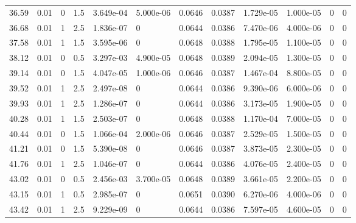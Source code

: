 \documentclass[preview]{standalone}
\begin{document}
{{{\begin{tabular}{L{1.2cm}C{1.2cm} C{0.3cm}C{0.5cm} C{1.4cm}C{1.4cm} C{1.4cm}C{1.4cm} C{1.6cm}C{1.6cm} C{1.6cm}C{1.6cm}}
  36.59  &  0.01  & 0     & 1.5 &  3.649e-04  & 5.000e-06  &  0.0646&   0.0387& 1.729e-05 & 1.000e-05   &  0 & 0  \\ 
  36.68  &  0.01  & 1     & 2.5 &  1.836e-07  & 0  &  0.0644&   0.0386& 7.470e-06 & 4.000e-06   &  0 & 0  \\ 
  37.58  &  0.01  & 1     & 1.5 &  3.595e-06  & 0  &  0.0648&   0.0388& 1.795e-05 & 1.100e-05   &  0 & 0  \\ 
  38.12  &  0.01  & 0     & 0.5 &  3.297e-03  & 4.900e-05  &  0.0648&   0.0389& 2.094e-05 & 1.300e-05   &  0 & 0  \\ 
  39.14  &  0.01  & 0     & 1.5 &  4.047e-05  & 1.000e-06  &  0.0646&   0.0387& 1.467e-04 & 8.800e-05   &  0 & 0  \\ 
  39.52  &  0.01  & 1     & 2.5 &  2.497e-08  & 0  &  0.0644&   0.0386& 9.390e-06 & 6.000e-06   &  0 & 0  \\ 
  39.93  &  0.01  & 1     & 2.5 &  1.286e-07  & 0  &  0.0644&   0.0386& 3.173e-05 & 1.900e-05   &  0 & 0  \\ 
  40.28  &  0.01  & 1     & 1.5 &  2.503e-07  & 0  &  0.0648&   0.0388& 1.170e-04 & 7.000e-05   &  0 & 0  \\ 
  40.44  &  0.01  & 0     & 1.5 &  1.066e-04  & 2.000e-06  &  0.0646&   0.0387& 2.529e-05 & 1.500e-05   &  0 & 0  \\ 
  41.21  &  0.01  & 0     & 1.5 &  5.390e-08  & 0  &  0.0646&   0.0387& 3.873e-05 & 2.300e-05   &  0 & 0  \\ 
  41.76  &  0.01  & 1     & 2.5 &  1.046e-07  & 0  &  0.0644&   0.0386& 4.076e-05 & 2.400e-05   &  0 & 0  \\ 
  43.02  &  0.01  & 0     & 0.5 &  2.456e-03  & 3.700e-05  &  0.0648&   0.0389& 3.661e-05 & 2.200e-05   &  0 & 0  \\ 
  43.15  &  0.01  & 1     & 0.5 &  2.985e-07  & 0  &  0.0651&   0.0390& 6.270e-06 & 4.000e-06   &  0 & 0  \\ 
  43.42  &  0.01  & 1     & 2.5 &  9.229e-09  & 0  &  0.0644&   0.0386& 7.597e-05 & 4.600e-05   &  0 & 0  \\ 
\hline 
\end{tabular} 

}}}
\end{document}
